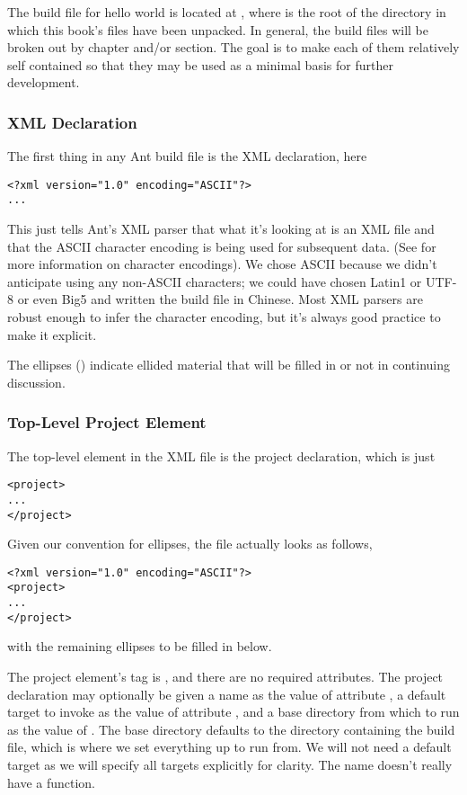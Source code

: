 The build file for hello world is located at
, where \relpath{} is the root of the
directory in which this book's files have been unpacked.  In general, the
build files will be broken out by chapter and/or section.  The goal is
to make each of them relatively self contained so that they may be
used as a minimal basis for further development.

\subsubsection{XML Declaration}

The first thing in any Ant build file is the XML declaration, here
%
\begin{verbatim}
<?xml version="1.0" encoding="ASCII"?>
...
\end{verbatim}
%
This just tells Ant's XML parser that what it's looking at is an XML
file and that the ASCII character encoding is being used for
subsequent data.  (See
 for more information on character encodings).  
We chose ASCII because we didn't anticipate using any non-ASCII
characters; we could have chosen Latin1 or UTF-8 or even Big5 and
written the build file in Chinese.  Most XML parsers are robust enough
to infer the character encoding, but it's always good practice to make
it explicit.

The ellipses () indicate ellided material that will be
filled in or not in continuing discussion.  

\subsubsection{Top-Level Project Element} 

The top-level element in the XML file is the project declaration,
which is just
%
\begin{verbatim}
<project>
...
</project>
\end{verbatim}
%
Given our convention for ellipses, the file actually looks as follows,

\begin{verbatim}
<?xml version="1.0" encoding="ASCII"?>
<project>
...
</project>
\end{verbatim}
%
with the remaining ellipses to be filled in below.

The project element's tag is , and there are no required
attributes.  The project declaration may optionally be given a name as
the value of attribute , a default target to invoke as the
value of attribute , and a base directory from which to
run as the value of .  The base directory defaults
to the directory containing the build file, which is where we set
everything up to run from.  We will not need a default target as we
will specify all targets explicitly for clarity.  The name doesn't
really have a function.

